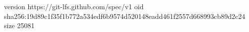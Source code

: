 version https://git-lfs.github.com/spec/v1
oid sha256:19d89c1f35f1b772a534edf6b9574d520148eadd461f2557d668993cb89d2c24
size 25081
